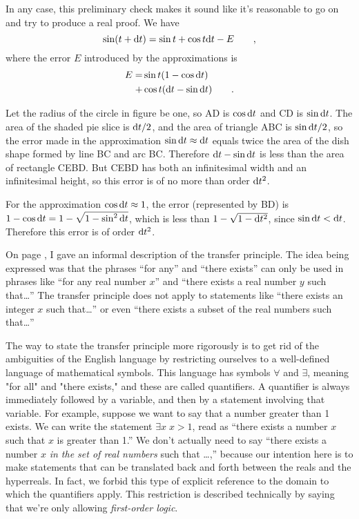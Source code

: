 In any case, this preliminary check makes it sound like it's reasonable to go on and try to produce a
real proof. We have
\begin{equation*}
  \sin(t+\textup{d} t) = \sin t + \cos t \textup{d} t - E \qquad ,
\end{equation*}
where the error $E$ introduced by the approximations is
\begin{align*}
  E = &\sin t (1-\cos \textup{d} t) \\
    + &\cos t (\textup{d} t - \sin \textup{d} t) \qquad .
\end{align*}

Let the radius of the circle in figure  be one, so AD
is $\cos \textup{d} t$ and CD is $\sin \textup{d} t$. The area of the shaded pie slice
is $\textup{d} t/2$, and the area of triangle ABC is $\sin\textup{d} t/2$, so the
error made in the approximation $\sin\textup{d} t\approx\textup{d} t$ equals twice
the area of the dish shape formed by line BC and arc BC. Therefore
$\textup{d} t-\sin\textup{d} t$ is less than the area of rectangle CEBD.
But CEBD has both an infinitesimal width and an infinitesimal height,
so this error is of no more than order $\textup{d} t^2$.

For the approximation $\cos\textup{d} t\approx 1$, the error (represented
by BD) is $1-\cos\textup{d} t=1-\sqrt{1-\sin^2\textup{d} t}$, which is less
than $1-\sqrt{1-\textup{d} t^2}$, since $\sin \textup{d} t<\textup{d} t$. Therefore
this error is of order $\textup{d} t^2$.

\label{transfer}
On page \pageref{backref-transfer}, I gave an informal description of the transfer principle.
The idea being expressed was that the phrases ``for any'' and
``there exists'' can only be used in phrases like ``for any real number $x$'' and ``there exists
a real number $y$ such that\ldots'' The transfer principle does not apply to statements like ``there exists
an integer $x$ such that\ldots'' or even ``there exists a subset of the real numbers such that\ldots''

The way to state the transfer principle more rigorously is to get rid of the ambiguities of
the English language by restricting ourselves to a well-defined language of mathematical symbols.
This language has symbols $\forall$ and $\exists$, meaning "for all" and "there exists," and these
are called quantifiers. A quantifier is always immediately followed by a variable, and
then by a statement involving that variable.
For example, suppose we want to say that a number greater than 1 exists. We can write the statement $\exists x \; x>1$,
read as ``there exists a number $x$ such that $x$ is greater than 1.'' We don't actually need to say
``there exists a number $x$ \emph{in the set of real numbers} such that \ldots,'' because our intention here is to make statements
that can be translated back and forth between the reals and the hyperreals. In fact, we forbid this
type of explicit reference to the domain to which the quantifiers apply. This restriction is described
technically by saying that we're only allowing \emph{first-order logic}.

